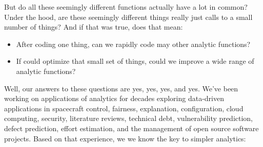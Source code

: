 \documentclass[landscape,	DIV=calc,%
							paper=letter,%
							fontsize=10pt,%
							twocolumn]{scrartcl}	 					%
\begin{document}
But do all these seemingly different functions actually have a lot in common? 
Under the hood, are these seemingly
different things
really just calls
to a small number of things?  And if that was true,  does that mean:
\begin{itemize}
    \item
        After coding one thing, can we rapidly code may other  analytic functions?
    \item
If could 
optimize that small set of things,  could we improve a wide range of analytic functions?
\end{itemize}
Well,  our answers to these questions are yes, yes, yes, and yes.
We've been working on applications of analytics for decades
exploring data-driven applications in 
spacecraft control, fairness, explanation, configuration, cloud computing,  security, literature reviews,
technical  debt,  vulnerability prediction, defect prediction, effort estimation,  and the management
of open source software projects.
Based on that experience, we
we know the key to simpler analytics:
\end{document}
